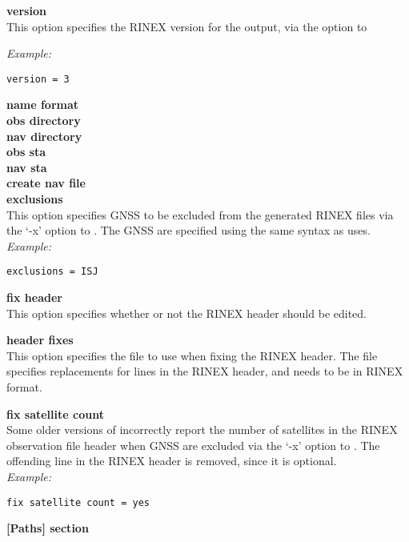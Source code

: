 {\bfseries version}\\
This option specifies the RINEX version for the output, via the option to 

\textit{Example:}
\begin{lstlisting}
version = 3 
\end{lstlisting}

{\bfseries name format}\\

{\bfseries obs directory}\\

{\bfseries nav directory}\\

{\bfseries obs sta}\\

{\bfseries nav sta}\\

{\bfseries create nav file}\\

{\bfseries exclusions}\\
This option specifies GNSS to be excluded from the generated RINEX files via the `-x' option to .
The GNSS are specified using the same syntax as  uses.\\
\textit{Example:}
\begin{lstlisting}
exclusions = ISJ 
\end{lstlisting}

{\bfseries fix header}\\
This option specifies whether or not the RINEX header should be edited.

{\bfseries header fixes}\\
This option specifies the file to use when fixing the RINEX header. The file specifies replacements for lines in the
RINEX header, and needs to be in RINEX format.

{\bfseries fix satellite count}\\
Some older versions of  incorrectly report the number of satellites in the RINEX observation file header
when GNSS are excluded via the `-x' option to . The offending line in the RINEX header is removed, since
it is optional.\\
\textit{Example:}
\begin{lstlisting}
fix satellite count = yes 
\end{lstlisting}

{\bfseries [Paths] section}\\

